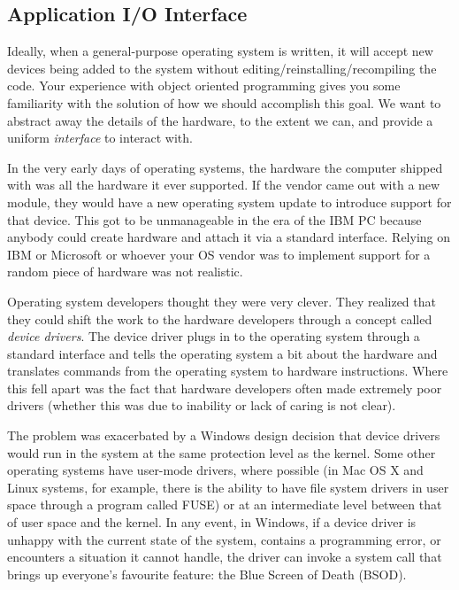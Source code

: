 \subsection*{Application I/O Interface}

Ideally, when a general-purpose operating system is written, it will accept new devices being added to the system without editing/reinstalling/recompiling the code. Your experience with object oriented programming gives you some familiarity with the solution of how we should accomplish this goal. We want to abstract away the details of the hardware, to the extent we can, and provide a uniform \textit{interface} to interact with. 

In the very early days of operating systems, the hardware the computer shipped with was all the hardware it ever supported. If the vendor came out with a new module, they would have a new operating system update to introduce support for that device. This got to be unmanageable in the era of the IBM PC because anybody could create hardware and attach it via a standard interface. Relying on IBM or Microsoft or whoever your OS vendor was to implement support for a random piece of hardware was not realistic.

Operating system developers thought they were very clever. They realized that they could shift the work to the hardware developers through a concept called \textit{device drivers}. The device driver plugs in to the operating system through a standard interface and tells the operating system a bit about the hardware and translates commands from the operating system to hardware instructions. Where this fell apart was the fact that hardware developers often made extremely poor drivers (whether this was due to inability or lack of caring is not clear).

The problem was exacerbated by a Windows design decision that device drivers would run in the system at the same protection level as the kernel. Some other operating systems have user-mode drivers, where possible (in Mac OS X and Linux systems, for example, there is the ability to have file system drivers in user space through a program called FUSE) or at an intermediate level between that of user space and the kernel. In any event, in Windows, if a device driver is unhappy with the current state of the system, contains a programming error, or encounters a situation it cannot handle, the driver can invoke a system call that brings up everyone's favourite feature: the Blue Screen of Death (BSOD).

